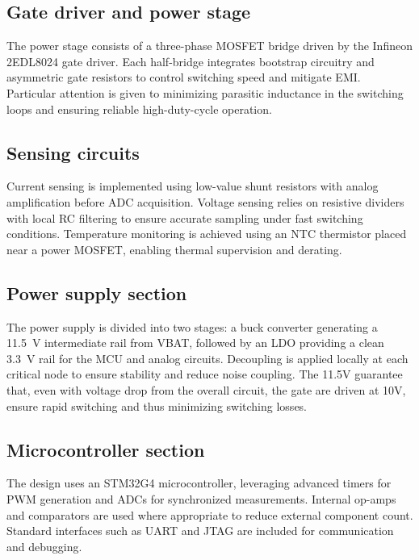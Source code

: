 \documentclass[11pt,a4paper]{article}
\begin{document}
\subsection{Gate driver and power stage}

The power stage consists of a three-phase MOSFET bridge driven by the Infineon 2EDL8024 gate driver. Each half-bridge integrates bootstrap circuitry and asymmetric gate resistors to control switching speed and mitigate EMI. Particular attention is given to minimizing parasitic inductance in the switching loops and ensuring reliable high-duty-cycle operation.

\subsection{Sensing circuits}

Current sensing is implemented using low-value shunt resistors with analog amplification before ADC acquisition. Voltage sensing relies on resistive dividers with local RC filtering to ensure accurate sampling under fast switching conditions. Temperature monitoring is achieved using an NTC thermistor placed near a power MOSFET, enabling thermal supervision and derating.

\subsection{Power supply section}

The power supply is divided into two stages: a buck converter generating a 11.5~V intermediate rail from VBAT, followed by an LDO providing a clean 3.3~V rail for the MCU and analog circuits. Decoupling is applied locally at each critical node to ensure stability and reduce noise coupling. The 11.5V guarantee that, even with voltage drop from the overall circuit, the gate are driven at 10V, ensure rapid switching and thus minimizing switching losses.

\subsection{Microcontroller section}

The design uses an STM32G4 microcontroller, leveraging advanced timers for PWM generation and ADCs for synchronized measurements. Internal op-amps and comparators are used where appropriate to reduce external component count. Standard interfaces such as UART and JTAG are included for communication and debugging.
\end{document}
